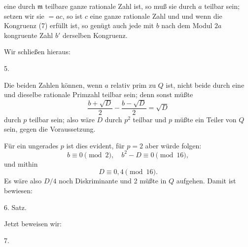 
eine durch $\mathfrak{m}$ teilbare ganze rationale Zahl ist, so muß sie durch $a$ teilbar sein; setzen wir sie $= ac$, so ist $c$ eine ganze rationale Zahl und
und wenn die Kongruenz (7) erfüllt ist, so genügt auch jede mit $b$ nach dem Modul $2a$ kongruente Zahl $b'$ derselben Kongruenz.

Wir schließen hieraus:

5. 

Die beiden Zahlen
können, wenn $a$ relativ prim zu $Q$ ist, nicht beide durch eine und dieselbe rationale Primzahl teilbar sein; denn sonst müßte
\[ \frac{b + \sqrt{D}}{2} - \frac{b - \sqrt{D}}{2} = \sqrt{D} \]
durch $p$ teilbar sein; also wäre $D$ durch $p^2$ teilbar und $p$ müßte ein Teiler von $Q$ sein, gegen die Voraussetzung.

Für ein ungerades $p$ ist dies evident, für $p = 2$ aber würde folgen:
\[ b \equiv 0 \pmod{2}, \quad b^2 - D \equiv 0 \pmod{16}, \]
und mithin
\[ D \equiv 0, 4 \pmod{16}. \]
Es wäre also $D/4$ noch Diskriminante und 2 müßte in $Q$ aufgehen. Damit ist bewiesen:

6. Satz. 

Jetzt beweisen wir:

7. 
